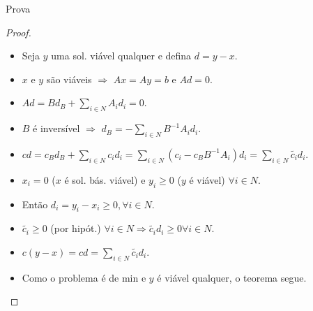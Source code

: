 \documentclass[dvipsnames]{beamer}
\begin{document}
  \begin{frame}{Prova \hyperlink{dualrelax}{\beamergotobutton{$\leftarrow$}}}
    \begin{proof}
      \begin{itemize}
      \item <1-> Seja $y$ uma sol. viável qualquer e defina $d = y - x$.
      \item <2-> $x$ e $y$ são viáveis $\Rightarrow$ $Ax = Ay = b$ e $Ad = 0$.
      \item <3-> $Ad = Bd_{B} + \sum_{i \in N} A_{i}d_{i} = 0$.
      \item <4-> $B$ é inversível $\Rightarrow$ $d_{B} = - \sum_{i \in N} B^{-1}A_{i}d_{i}$.
      \item <5-> $cd = c_{B}d_{B} + \sum_{i \in N}c_{i}d_{i} = \sum_{i \in N}(c_i - c_{B}B^{-1}A_{i})d_i = \sum_{i \in N} \tilde{c_i}d_i$.
      \item <6-> $x_i = 0$ ($x$ é sol. bás. viável) e $y_i \ge 0$ ($y$ é viável) $\forall i \in N$.
      \item <7-> Então $d_i = y_i - x_i \ge 0, \forall i \in N$.
      \item <8-> $\tilde{c_i} \ge 0$ (por hipót.) $\forall i \in N \Rightarrow \tilde{c_i}d_i \ge 0 \forall i \in N$.
      \item <9-> $c(y - x) = cd = \sum_{i \in N} \tilde{c_i}d_i$.
        \item <10-> Como o problema é de min e $y$ é viável qualquer, o teorema segue.
        \end{itemize}
      \end{proof}
    \end{frame}

\end{document}
